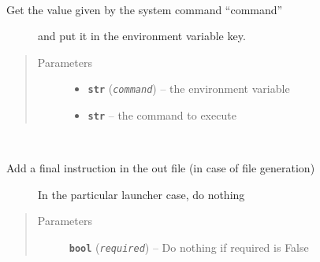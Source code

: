 \documentclass[a4paper,10pt,english]{sphinxmanual}
\begin{document}
\begin{fulllineitems}
\begin{fulllineitems}
\label{commands/apidoc/src:src.fileEnviron.LauncherFileEnviron.command_value}~\begin{description}
\item[{Get the value given by the system command ``command'' }] \leavevmode
and put it in the environment variable key.

\end{description}
\begin{quote}\begin{description}
\item[{Parameters}] \leavevmode\begin{itemize}
\item {} 
\textbf{\texttt{str}} (\emph{\texttt{command}}) -- the environment variable

\item {} 
\textbf{\texttt{str}} -- the command to execute

\end{itemize}

\end{description}\end{quote}

\end{fulllineitems}


\begin{fulllineitems}
\label{commands/apidoc/src:src.fileEnviron.LauncherFileEnviron.finish}~\begin{description}
\item[{Add a final instruction in the out file (in case of file generation)}] \leavevmode
In the particular launcher case, do nothing

\end{description}
\begin{quote}\begin{description}
\item[{Parameters}] \leavevmode
\textbf{\texttt{bool}} (\emph{\texttt{required}}) -- Do nothing if required is False

\end{description}\end{quote}

\end{fulllineitems}


\end{fulllineitems}
\end{document}
